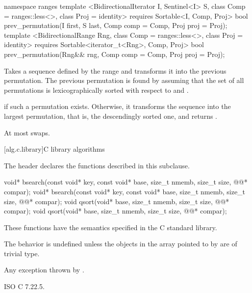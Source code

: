 \begin{addedblock}
%
\begin{itemdecl}
namespace ranges {
  template <BidirectionalIterator I, Sentinel<I> S, class Comp = ranges::less<>,
            class Proj = identity>
      requires Sortable<I, Comp, Proj>
    bool prev_permutation(I first, S last, Comp comp = Comp{}, Proj proj = Proj{});
  template <BidirectionalRange Rng, class Comp = ranges::less<>, class Proj = identity>
      requires Sortable<iterator_t<Rng>, Comp, Proj>
    bool prev_permutation(Rng&& rng, Comp comp = Comp{}, Proj proj = Proj{});
}
\end{itemdecl}

\begin{itemdescr}
\pnum
\effects
Takes a sequence defined by the range
and transforms it into the previous permutation.
The previous permutation is found by assuming that the set of all permutations is
lexicographically sorted with respect to
 and .

\pnum
\returns
{}
if such a permutation exists.
Otherwise, it transforms the sequence into the largest permutation,
that is, the descendingly sorted one, and returns
.

\pnum
\complexity
At most
swaps.
\end{itemdescr}
\end{addedblock}

[alg.c.library]{C library algorithms}

\pnum
{}%
\begin{note}
The header 
declares the functions described in this subclause.
\end{note}

%
%
\begin{itemdecl}
void* bsearch(const void* key, const void* base, size_t nmemb, size_t size,
              @@* compar);
void* bsearch(const void* key, const void* base, size_t nmemb, size_t size,
              @@* compar);
void qsort(void* base, size_t nmemb, size_t size, @@* compar);
void qsort(void* base, size_t nmemb, size_t size, @@* compar);
\end{itemdecl}

\begin{itemdescr}
\pnum
\effects
These functions have the semantics specified in the C standard library.

\pnum
\remarks
The behavior is undefined
unless the objects in the array pointed to by 
are of trivial type.

\pnum
\throws
Any exception thrown by .
\end{itemdescr}

\xref
ISO C 7.22.5.
